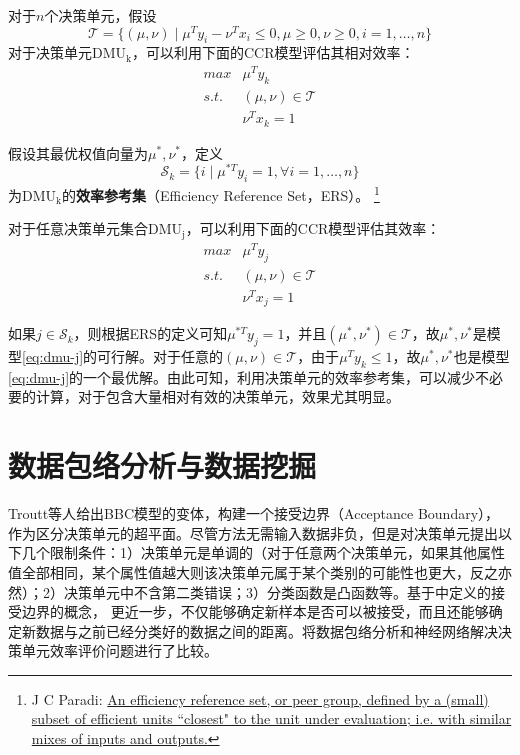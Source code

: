 对于$n$个决策单元，假设
\begin{equation}\label{eq:productset}
  \mathcal{T} = \bigg\{(\mu,\nu)\mid \mu^T y_i - \nu^T x_i \le 0, \mu \ge 0, \nu \ge 0, i=1,\ldots, n\bigg\}
\end{equation}
对于决策单元$\mathrm{DMU_k}$，可以利用下面的CCR模型评估其相对效率：
\begin{equation}
  \begin{array}{ll}
    \textit{max} & \mu^T y_k \\
    \textit{s.t.} & (\mu, \nu)\in \mathcal{T} \\
     & \nu^T x_k = 1
  \end{array}
\end{equation}

假设其最优权值向量为$\mu^*, \nu^*$，定义
\begin{equation}\label{eq:ers-k}
  \mathcal{S}_k = \big\{i\mid \mu^{*T} y_i = 1, \forall i=1,\ldots, n\big\}
\end{equation}
为$\mathrm{DMU_k}$的\textbf{效率参考集}（Efficiency Reference Set，ERS）\cite{cooper2011handbook}。
\footnote{J C Paradi: \href{http://www.cmte.utoronto.ca/research/dea.shtml}{An efficiency reference set, or peer group, defined by a (small) subset of efficient units ``closest" to the unit under evaluation; i.e. with similar mixes of inputs and outputs.}}

对于任意决策单元集合$\mathrm{DMU_j}$，可以利用下面的CCR模型评估其效率：
\begin{equation}\label{eq:dmu-j}
  \begin{array}{ll}
    \textit{max} & \mu^T y_j \\
    \textit{s.t.} & (\mu, \nu)\in \mathcal{T} \\
     & \nu^T x_j = 1
  \end{array}
\end{equation}

如果$j\in \mathcal{S}_k$，则根据ERS的定义可知$\mu^{*T} y_j = 1$，并且$(\mu^*, \nu^*)\in \mathcal{T}$，故$\mu^*, \nu^*$是模型\eqref{eq:dmu-j}的可行解。对于任意的$(\mu, \nu) \in \mathcal{T}$，由于$\mu^T y_k \le 1$，故$\mu^*, \nu^*$也是模型\eqref{eq:dmu-j}的一个最优解。由此可知，利用决策单元的效率参考集，可以减少不必要的计算，对于包含大量相对有效的决策单元，效果尤其明显。

\section{数据包络分析与数据挖掘}
Troutt等人\cite{troutt1996potential}给出BBC模型的变体，构建一个接受边界（Acceptance Boundary），作为区分决策单元的超平面。尽管方法无需输入数据非负，但是对决策单元提出以下几个限制条件：1）决策单元是单调的（对于任意两个决策单元，如果其他属性值全部相同，某个属性值越大则该决策单元属于某个类别的可能性也更大，反之亦然）；2）决策单元中不含第二类错误；3）分类函数是凸函数等。基于\cite{troutt1996potential}中定义的接受边界的概念，\cite{seiford1998acceptance} 更近一步，不仅能够确定新样本是否可以被接受，而且还能够确定新数据与之前已经分类好的数据之间的距离。\cite{athanassopoulos1996comparison}将数据包络分析和神经网络解决决策单元效率评价问题进行了比较。

